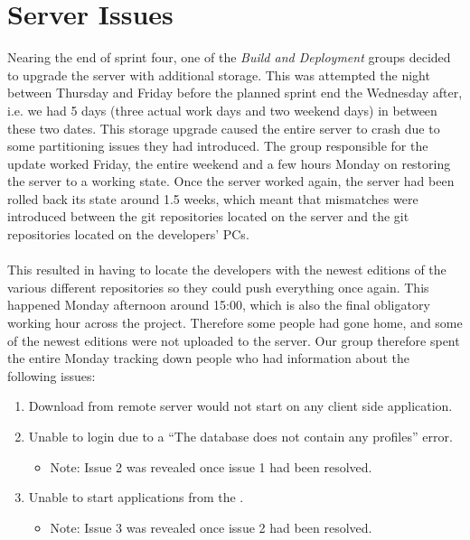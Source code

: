 
\section{Server Issues} 
\label{sec:server_issues}

Nearing the end of sprint four, one of the \emph{Build and Deployment} groups decided to upgrade the server with additional storage. This was attempted the night between Thursday and Friday before the planned sprint end the Wednesday after, i.e. we had 5 days (three actual work days and two weekend days) in between these two dates. This storage upgrade caused the entire server to crash due to some partitioning issues they had introduced. The group responsible for the update worked Friday, the entire weekend and a few hours Monday on restoring the server to a working state. Once the server worked again, the server had been rolled back its state around 1.5 weeks, which meant that mismatches were introduced between the git repositories located on the server and the git repositories located on the developers' PCs. 
\\\\
This resulted in having to locate the developers with the newest editions of the various different repositories so they could push everything once again. This happened Monday afternoon around 15:00, which is also the final obligatory working hour across the project. Therefore some people had gone home, and some of the newest editions were not uploaded to the server. Our group therefore spent the entire Monday tracking down people who had information about the following issues:

\begin{enumerate}
    \item Download from remote server would not start on any client side application.
    \item Unable to login due to a ``The database does not contain any profiles'' error.
    \begin{itemize}
        \item Note: Issue 2 was revealed once issue 1 had been resolved.
    \end{itemize}
    \item Unable to start applications from the \launcher.   
    \begin{itemize}
        \item Note: Issue 3 was revealed once issue 2 had been resolved. 
    \end{itemize}
\end{enumerate}


